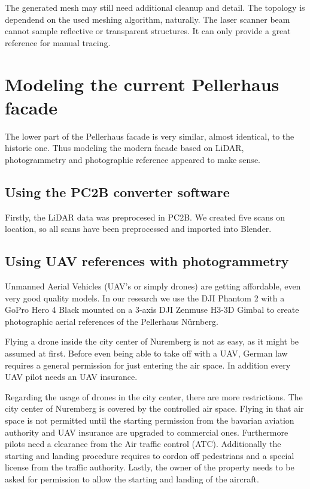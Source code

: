 The generated mesh may still need additional cleanup and detail. The topology is dependend on the used meshing algorithm, naturally. The laser scanner beam cannot sample reflective or transparent structures. It can only provide a great reference for manual tracing.

\section{Modeling the current Pellerhaus facade}

The lower part of the Pellerhaus facade is very similar, almost identical, to the historic one. Thus modeling the modern facade based on LiDAR, photogrammetry and photographic reference appeared to make sense.

\subsection{Using the PC2B converter software}

Firstly, the LiDAR data was preprocesed in PC2B. We created five scans on location, so all scans have been preprocessed and imported into Blender.

\subsection{Using UAV references with photogrammetry}

Unmanned Aerial Vehicles (UAV's or simply drones) are getting affordable, even very good quality models. In our research we use the DJI Phantom 2 with a GoPro Hero 4 Black mounted on a 3-axis DJI Zenmuse H3-3D Gimbal to create photographic aerial references of the Pellerhaus Nürnberg.

Flying a drone inside the city center of Nuremberg is not as easy, as it might be assumed at first. Before even being able to take off with a UAV, German law requires a general permission for just entering the air space. In addition every UAV pilot needs an UAV insurance.

Regarding the usage of drones in the city center, there are more restrictions. The city center of Nuremberg is covered by the controlled air space. Flying in that air space is not permitted until the starting permission from the bavarian aviation authority and UAV insurance are upgraded to commercial ones. Furthermore pilots need a clearance from the Air traffic control (ATC). Additionally the starting and landing procedure requires to cordon off pedestrians and a special license from the traffic authority. Lastly, the owner of the property needs to be asked for permission to allow the starting and landing of the aircraft.

